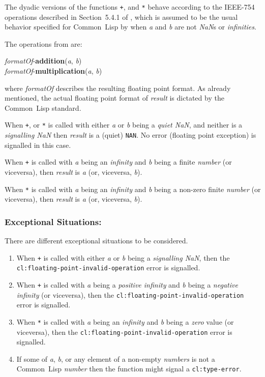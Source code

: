 \documentclass[10pt,fleqn]{article}
\newcommand{\CL}{\textsf{Common~Lisp}}
\newcommand{\code}[1]{\texttt{#1}}
\newcommand{\clieeeterm}[1]{\textit{#1}}
\newcommand{\varname}[1]{\textit{#1}}
\newcommand{\clterm}[1]{\textit{#1}}
\newcommand{\clname}[1]{\texttt{#1}}
\newcommand{\IEEEFPStd}{IEEE-754}
\newcommand{\DExceptional}{\subsubsection*{Exceptional Situations:}}
\begin{document}
The dyadic versions of the functions \code{+}, and \code{*} behave
according to the \IEEEFPStd{} operations described in Section~5.4.1 of
\cite{2008:IEEE-754}, which is assumed to be the usual behavior specified
for \CL{} by \cite{1996:ANSIHyperSpec} when \varname{a} and \varname{b} are
not \emph{NaN}s or \emph{infinities}.

\noindent
The operations from \cite{2008:IEEE-754} are:

\vspace*{3mm}

\noindent
\textit{formatOf}-\textbf{addition}(\varname{a}, \varname{b})\\
\textit{formatOf}-\textbf{multiplication}(\varname{a}, \varname{b})

\vspace*{3mm}

\noindent
where \textit{formatOf} describes the resulting floating point
format.  As already mentioned, the actual floating point format of
\varname{result} is dictated by the \CL{} standard.

When \code{+}, or \code{*} is called with either \varname{a} or
\varname{b} being a \emph{quiet NaN}, and neither is a
\emph{signalling NaN} then \varname{result} is a (quiet) \code{NAN}.
No error (floating point exception) is signalled in this case.

When \code{+} is called with \varname{a} being an 
\clieeeterm{infinity} and \varname{b} being a finite \clterm{number}
(or viceversa), then \varname{result} is \varname{a} (or, viceversa, 
\varname{b}).

When \code{*} is called with \varname{a} being an
\clieeeterm{infinity} and \varname{b} being a non-zero finite
\clterm{number} (or viceversa), then \varname{result} is \varname{a}
(or, viceversa, \varname{b}).

\DExceptional{}

There are different exceptional situations to be considered.

\begin{enumerate}
\item When \code{+} is called with either \varname{a} or \varname{b}
  being a \emph{signalling NaN}, then the\\
  \clname{cl:floating-point-invalid-operation} error is signalled.

\item When \code{+} is called with \varname{a} being a
  \clieeeterm{positive infinity} and \varname{b} being a
  \clieeeterm{negative infinity} (or viceversa), then the
  \clname{cl:floating-point-invalid-operation} error is signalled.

\item When \code{*} is called with \varname{a} being an
  \clieeeterm{infinity} and \varname{b} being a \clieeeterm{zero}
  value (or viceversa), then the
  \clname{cl:floating-point-invalid-operation} error is signalled.

\item If some of \varname{a}, \varname{b}, or any element of a non-empty
  \varname{numbers} is not a \CL{} \clterm{number} then the function
  might signal a \clname{cl:type-error}.
\end{enumerate}
\end{document}
